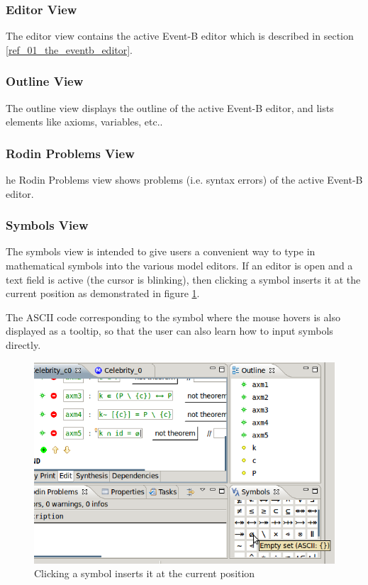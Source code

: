 \subsubsection{Editor View}

The editor view contains the active Event-B editor which is described in section \ref{ref_01_the_eventb_editor}.

\subsubsection{Outline View}

The outline view displays the outline of the active Event-B editor, and lists elements like axioms, variables, etc.. 

\subsubsection{Rodin Problems View}

he Rodin Problems view shows problems (i.e. syntax errors) of the active Event-B editor.

\subsubsection{Symbols View}
\label{reference_01_symbols_view}

The symbols view is intended to give users a convenient way to type in mathematical symbols into the various model editors. If an editor is open and a text field is active (the cursor is blinking), then clicking a symbol inserts it at the current position as demonstrated in figure \ref{fig_ref_01_symbol_table1}. 

The ASCII code corresponding to the symbol where the mouse hovers is also displayed as a tooltip, so that the user can also learn how to input symbols directly. 

\begin{figure}[!h]
\begin{center}
	\includegraphics{img/reference/ref_01_symbol_table1.png}
	\caption{Clicking a symbol inserts it at the current position}
	\label{fig_ref_01_symbol_table1}
\end{center}
\end{figure}

